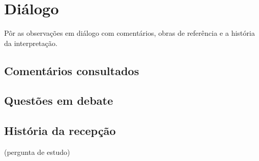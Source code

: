 \chapter{Diálogo}\label{cap:dialogo}

\begin{objetivo}
Pôr as observações em diálogo com comentários, obras de referência e a história da interpretação.
\end{objetivo}

\section{Comentários consultados}

\section{Questões em debate}

\section{História da recepção}

\begin{pergunta}
(pergunta de estudo)
\end{pergunta}
